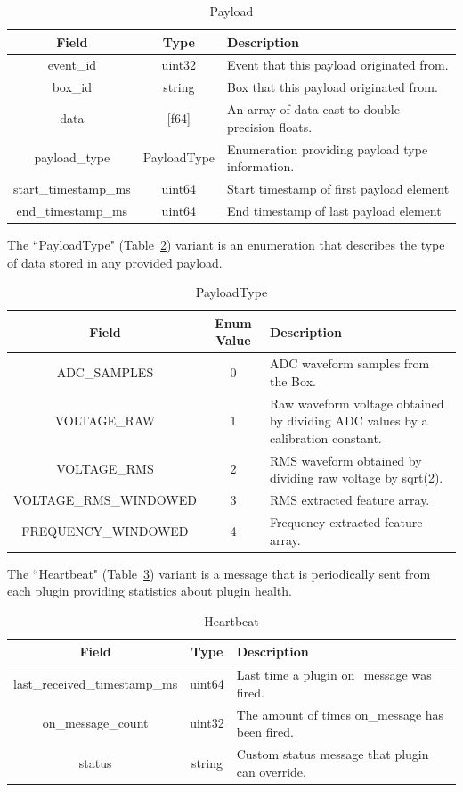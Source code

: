 \begin{table}[H]
	\centering
	\caption{Payload}
	\begin{tabular}{|c|c| p{8cm} |}
		\hline
		Field & Type & Description  \\
		\hline
		event\_id & uint32 & Event that this payload originated from.  \\
		\hline
		box\_id & string & Box that this payload originated from. \\
		\hline
		data & [f64] & An array of data cast to double precision floats. \\
		\hline
		payload\_type & PayloadType & Enumeration providing payload type information. \\
		start\_timestamp\_ms & uint64 & Start timestamp of first payload element \\
		\hline
		end\_timestamp\_ms & uint64 & End timestamp of last payload element\\
		\hline
	\end{tabular}
	\label{table:Payload}
\end{table}

The ``PayloadType" (Table~\ref{table:PayloadType}) variant is an enumeration that describes the type of data stored in any provided payload.

\begin{table}[H]
	\centering
	\caption{PayloadType}
	\begin{tabular}{|c|c| p{8cm} |}
		\hline
		Field & Enum Value & Description  \\
		\hline
		ADC\_SAMPLES & 0 & ADC waveform samples from the Box.  \\
		\hline
		VOLTAGE\_RAW & 1 & Raw waveform voltage obtained by dividing ADC values by a calibration constant. \\
		\hline
		VOLTAGE\_RMS & 2 & RMS waveform obtained by dividing raw voltage by sqrt(2). \\
		\hline
		VOLTAGE\_RMS\_WINDOWED & 3 & RMS extracted feature array. \\
		\hline
		FREQUENCY\_WINDOWED & 4 & Frequency extracted feature array. \\
		\hline
	\end{tabular}
	\label{table:PayloadType}
\end{table}

The ``Heartbeat" (Table~\ref{table:Heartbeat}) variant is a message that is periodically sent from each plugin providing statistics about plugin health.

\begin{table}[H]
	\centering
	\caption{Heartbeat}
	\begin{tabular}{|c|c|p{8cm}|}
		\hline
		Field & Type & Description  \\
		\hline
		last\_received\_timestamp\_ms & uint64 & Last time a plugin on\_message was fired.  \\
		\hline
		on\_message\_count & uint32 & The amount of times on\_message has been fired. \\
		\hline
		status & string & Custom status message that plugin can override. \\
		\hline
	\end{tabular}
	\label{table:Heartbeat}
\end{table}

